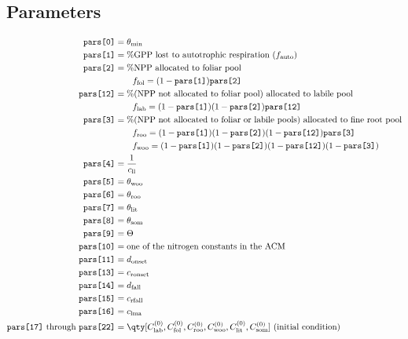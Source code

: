 \documentclass{article}
\begin{document}
		\subsection{Parameters}
			\begin{align*}
				\texttt{pars[0]} &= \theta_\text{min}\\
				\texttt{pars[1]} &= \text{\%GPP lost to autotrophic respiration ($f_\text{auto}$)}\\
				\texttt{pars[2]} &= \text{\%NPP allocated to foliar pool}\\
				&\qquad f_\text{fol} = (1-\texttt{pars[1]})\texttt{pars[2]}\\
				\texttt{pars[12]} &= \text{\%(NPP not allocated to foliar pool) allocated to labile pool}\\
				&\qquad f_\text{lab} = (1-\texttt{pars[1]})(1-\texttt{pars[2]})\texttt{pars[12]}\\
				\texttt{pars[3]} &= \text{\%(NPP not allocated to foliar or labile pools) allocated to fine root pool}\\
				&\qquad f_\text{roo} = (1-\texttt{pars[1]})(1-\texttt{pars[2]})(1-\texttt{pars[12]})\texttt{pars[3]}\\
				&\qquad f_\text{woo} = (1-\texttt{pars[1]})(1-\texttt{pars[2]})(1-\texttt{pars[12]})(1-\texttt{pars[3]})\\
				\texttt{pars[4]} &= \frac{1}{c_\text{ll}}\\
				\texttt{pars[5]} &= \theta_\text{woo}\\
				\texttt{pars[6]} &= \theta_\text{roo}\\
				\texttt{pars[7]} &= \theta_\text{lit}\\
				\texttt{pars[8]} &= \theta_\text{som}\\
				\texttt{pars[9]} &= \Theta\\
				\texttt{pars[10]} &= \text{one of the nitrogen constants in the ACM}\\
				\texttt{pars[11]} &= d_\text{onset}\\
				\texttt{pars[13]} &= c_\text{ronset}\\
				\texttt{pars[14]} &= d_\text{fall}\\
				\texttt{pars[15]} &= c_\text{rfall}\\
				\texttt{pars[16]} &= c_\text{lma}\\
				\texttt{pars[17]}\text{ through }\texttt{pars[22]} &= \qty[C_\text{lab}^{(0)},C_\text{fol}^{(0)},C_\text{roo}^{(0)},C_\text{woo}^{(0)},C_\text{lit}^{(0)},C_\text{som}^{(0)}]\text{ (initial condition)}\\

\end{align*}
\end{document}
